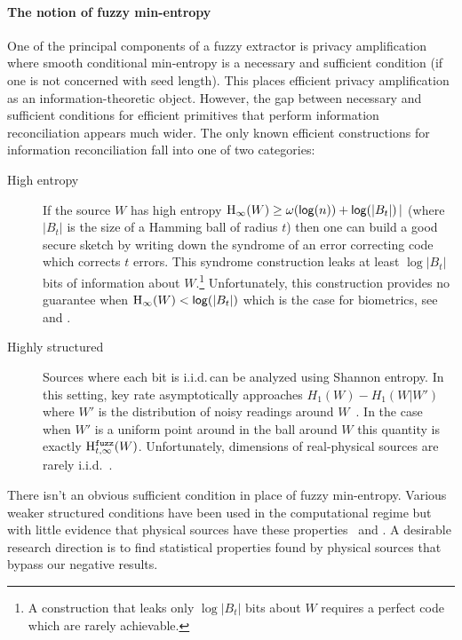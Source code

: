 \paragraph{The notion of fuzzy min-entropy}
One of the principal components of a fuzzy extractor is privacy amplification where smooth conditional min-entropy is a necessary and sufficient condition (if one is not concerned with seed length).  This places efficient privacy amplification as an information-theoretic object.  However, the gap between necessary and sufficient conditions for efficient primitives that perform information reconciliation appears much wider. The only known efficient constructions for information reconciliation fall into one of two categories:
\begin{description}
\item[High entropy] If the source $W$ has high entropy $\mathrm{H}_\infty(W)\ge \omega(\mathsf{log}\!\left(n\right)) + \mathsf{log}\!\left(|B_t|\right)|$ (where $|B_t|$ is the size of a Hamming ball of radius $t$) then one can build a good secure sketch by writing down the syndrome of an error correcting code which corrects $t$ errors.  This syndrome construction  leaks at least $\log|B_t|$ bits of information about $W$.\footnote{A construction that leaks only $\log{|B_t|}$ bits about $W$ requires a perfect code which are rarely achievable.}  Unfortunately, this construction provides no guarantee when $\mathrm{H}_\infty(W)< \mathsf{log}\!\left(|B_t|\right)$ which is the case for biometrics, see \cite[Proposition 1]{canetti2021reusable} and \cite[Introduction]{simhadri2019cryptographic}.
\item[Highly structured] Sources where each bit is i.i.d.\,can be analyzed using Shannon entropy.  In this setting, key rate asymptotically approaches $H_1(W) - H_1(W|W')$ where $W'$ is the distribution of noisy readings around $W$~\cite[Theorem 2]{tuyls2004capacity}.  In the case when $W'$ is a uniform point around in the ball around $W$ this quantity is exactly $\mathrm{H}^{\mathtt{fuzz}}_{t,\infty}(W)$.  Unfortunately, dimensions of real-physical sources are rarely i.i.d.~\cite{daugman2004}.
\end{description}

There isn't an obvious sufficient condition in place of fuzzy min-entropy.  Various weaker structured conditions have been used in the computational regime but with little evidence that physical sources have these properties~\cite[Figure 1]{demarest2021code} and \cite{simhadri2019cryptographic}. A desirable research direction is to find statistical properties found by physical sources that bypass our negative results. 

